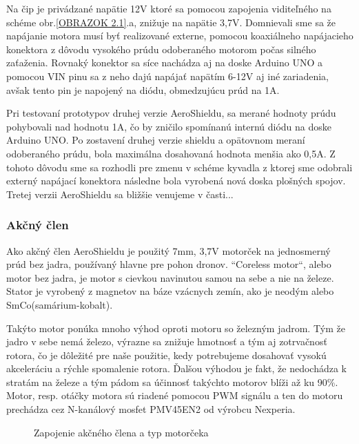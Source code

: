 Na čip je privádzané napätie 12V ktoré sa pomocou zapojenia viditeľného na schéme obr.\ref{OBRAZOK 2.1}.a, znižuje na napätie 3,7V. Domnievali sme sa že napájanie motora musí byť realizované externe, pomocou koaxiálneho napájacieho konektora z dôvodu vysokého prúdu odoberaného motorom počas silného zaťaženia. Rovnaký konektor sa síce nachádza aj na doske Arduino UNO a pomocou VIN pinu sa z neho dajú napájať napätím 6-12V aj iné zariadenia, avšak tento pin je napojený na diódu, obmedzujúcu prúd na 1A\cite{ampere}\cite{ampere2}. 

Pri testovaní prototypov druhej verzie AeroShieldu, sa merané hodnoty prúdu pohybovali nad hodnotu 1A, čo by zničilo spomínanú internú diódu na doske Arduino UNO. 
Po zostavení druhej verzie shieldu a opätovnom meraní odoberaného prúdu, bola maximálna dosahovaná hodnota menšia ako 0,5A. Z tohoto dôvodu sme sa rozhodli pre zmenu v schéme kyvadla z ktorej sme odobrali externý napájací konektora následne bola vyrobená nová doska plošných spojov. Tretej verzii AeroShieldu sa bližšie venujeme v časti...

\subsubsection{Akčný člen}
\label{akcclen}

Ako akčný člen AeroShieldu je použitý 7mm, 3,7V motorček na jednosmerný prúd bez jadra, používaný hlavne pre pohon dronov. “Coreless motor“, alebo motor bez jadra, je motor s cievkou navinutou samou na sebe a nie na železe\cite{coreless}. Stator je vyrobený z magnetov na báze vzácnych zemín, ako je neodým alebo SmCo(samárium-kobalt).

Takýto motor ponúka mnoho výhod oproti motoru so železným jadrom. Tým že jadro v sebe nemá železo, výrazne sa znižuje hmotnosť a tým aj zotrvačnosť rotora, čo je dôležité pre naše použitie, kedy potrebujeme dosahovať vysokú akceleráciu a rýchle spomalenie rotora. Ďalšou výhodou je fakt, že nedochádza k stratám na železe a tým pádom sa účinnosť takýchto motorov blíži až ku 90\%\cite{5545147}. Motor, resp. otáčky motora sú riadené pomocou PWM signálu a ten do motoru prechádza cez N-kanálový mosfet PMV45EN2 od výrobcu Nexperia\cite{pmv}.


\begin{figure}[!tbh]
	\hfill
	\hfill
	\hfill
	\caption{Zapojenie akčného člena a typ motorčeka}\label{OBRAZOK 2.3}
\end{figure}


